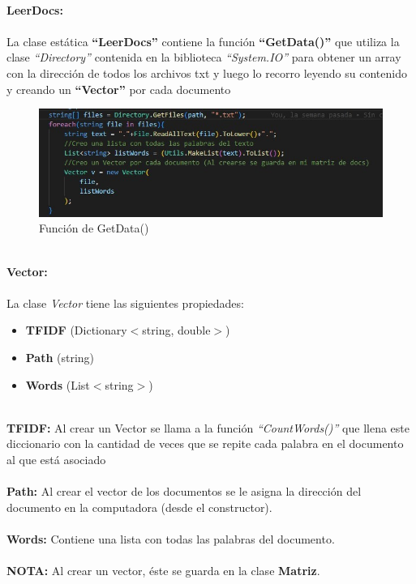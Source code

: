 \documentclass[10pt, letterpaper]{article}
\begin{document}
    \textbf{
            \\\large{LeerDocs:}\\
            \\
    }
    La clase estática \textbf{“LeerDocs”} contiene la función \textbf{“GetData()”} que utiliza la clase \textit{“Directory”}
    contenida en la biblioteca \textit{“System.IO”} para obtener un array con la dirección de todos 
    los archivos txt y luego lo recorro leyendo su contenido y creando un \textbf{“Vector”} por cada 
    documento
    \begin{figure}[h]
        \includegraphics[width = 13cm]{img/LeerDocs.jpg}
        \caption[]{Función de GetData()}
    \end{figure}
    \textbf{
            \\\large{Vector:}\\
            \\
    }
    La clase \textit{Vector} tiene las siguientes propiedades:
    \begin{itemize}
        \item \textbf{TFIDF} (Dictionary$<$string, double$>$)
        \item \textbf{Path} (string)
        \item \textbf{Words} (List$<$string$>$)
    \end{itemize}
    \newpage
    \textbf{\\TFIDF:} Al crear un Vector se llama a la función \textit{“CountWords()”} que llena este diccionario con 
    la cantidad de veces que se repite cada palabra en el documento al que está asociado\\ \\
    \textbf{Path:} Al crear el vector de los documentos se le asigna la dirección del documento en la 
    computadora (desde el constructor).\\ \\
    \textbf{Words:} Contiene una lista con todas las palabras del documento.\\ \\
    \textbf{NOTA:} Al crear un vector, éste se guarda en la clase \textbf{Matriz}. \\ 
\end{document}
